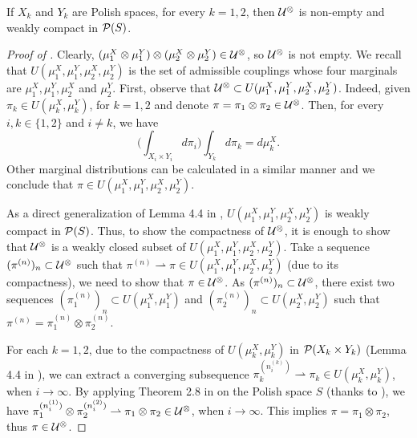 \begin{lemma} \label{lemma:compact_subset}
  If $X_k$ and $Y_k$ are Polish spaces, for every $k = 1, 2$,
  then $\mathcal U^{\otimes}$ is non-empty and weakly compact in $\mathcal P(S)$.
\end{lemma}
\begin{proof}[Proof of ]
  Clearly, $(\mu_1^X \otimes \mu_1^Y) \otimes (\mu_2^X \otimes \mu_2^Y) \in \mathcal U^{\otimes}$,
  so $\mathcal U^{\otimes}$ is not empty.
  We recall that $U(\mu_1^X, \mu_1^Y, \mu_2^X, \mu_2^Y)$ is the set of admissible couplings
  whose four marginals are $\mu^X_1, \mu^Y_1, \mu^X_2$ and $\mu^Y_2$. First,
  observe that $\mathcal U^{\otimes} \subset U(\mu_1^X, \mu_1^Y, \mu_2^X, \mu_2^Y)$.
  Indeed, given $\pi_k \in U(\mu_k^X, \mu_k^Y)$, for $k = 1,2$ and denote
  $\pi = \pi_1 \otimes \pi_2 \in \mathcal U^{\otimes}$. Then, for every $i, k \in \{ 1, 2 \}$ and $i \neq k$,
  we have
  \begin{equation}
      \bigg(\int_{X_{i} \times Y_{i}} d\pi_i \bigg) \int_{Y_k}  d\pi_k = d\mu_k^X.
  \end{equation}
  Other marginal distributions can be calculated in a similar manner and we conclude that
  $\pi \in U(\mu_1^X, \mu_1^Y, \mu_2^X, \mu_2^Y)$.

  As a direct generalization of Lemma 4.4 in \citep{Villani08},
  $U(\mu_1^X, \mu_1^Y, \mu_2^X, \mu_2^Y)$ is weakly compact in $\mathcal P(S)$. Thus,
  to show the compactness of $\mathcal U^{\otimes}$, it is enough to show that $\mathcal U^{\otimes}$
  is a weakly closed subset of $U(\mu_1^X, \mu_1^Y, \mu_2^X, \mu_2^Y)$.
  Take a sequence $(\pi^{(n)})_n \subset \mathcal U^{\otimes}$
  such that $\pi^{(n)} \rightharpoonup \pi \in U(\mu_1^X, \mu_1^Y, \mu_2^X, \mu_2^Y)$
  (due to its compactness), we need to show that $\pi \in \mathcal U^{\otimes}$.
  As $(\pi^{(n)})_n \subset \mathcal U^{\otimes}$, there exist two sequences
  $(\pi_1^{(n)})_n \subset U(\mu_1^X, \mu_1^Y)$ and $(\pi_2^{(n)})_n \subset U(\mu_2^X, \mu_2^Y)$
  such that $\pi^{(n)} = \pi_1^{(n)} \otimes \pi_2^{(n)}$.

  For each $k = 1, 2$, due to the compactness of $U(\mu_k^X, \mu_k^Y)$ in $\mathcal P(X_k \times Y_k)$
  (Lemma 4.4 in \citep{Villani08}), we can extract a converging subsequence
  $\pi^{(n_i^{(k)})}_k \rightharpoonup \pi_k \in U(\mu_k^X, \mu_k^Y)$, when $i \to \infty$.
  By applying Theorem 2.8 in \citep{Billingsley99} on the Polish space $S$
  (thanks to ), we have
  $\pi^{(n_i^{(1)})}_1 \otimes \pi^{(n_i^{(2)})}_2 \rightharpoonup \pi_1 \otimes \pi_2 \in \mathcal U^{\otimes}$,
  when $i \to \infty$. This implies $\pi = \pi_1 \otimes \pi_2$, thus $\pi \in \mathcal U^{\otimes}$.
\end{proof}
